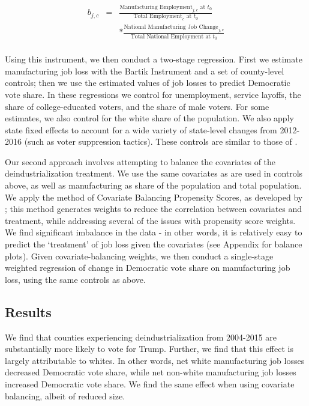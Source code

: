 \documentclass[]{AEA}
\begin{document}
\[
\begin{aligned}
b_{j,c} &=& \frac{\text{Manufacturing Employment}_{j,c} \text{ at } t_0}{\text{Total Employment}_c \text{ at }t_0}  \\
&&  * \frac{\text{National Manufacturing Job Change}_{j,c} }{\text{Total National Employment at }t_0} \\
\end{aligned}
\]

Using this instrument, we then conduct a two-stage regression. First we
estimate manufacturing job loss with the Bartik Instrument and a set of
county-level controls; then we use the estimated values of job losses to
predict Democratic vote share. In these regressions we control for
unemployment, service layoffs, the share of college-educated voters, and
the share of male voters. For some estimates, we also control for the
white share of the population. We also apply state fixed effects to
account for a wide variety of state-level changes from 2012-2016 (such
as voter suppression tactics). These controls are similar to those of
\cite{Baccini21}.

Our second approach involves attempting to balance the covariates of the
deindustrialization treatment. We use the same covariates as are used in
controls above, as well as manufacturing as share of the population and
total population. We apply the method of Covariate Balancing Propensity
Scores, as developed by \cite{Imai14}; this method generates weights to
reduce the correlation between covariates and treatment, while
addressing several of the issues with propensity score weights. We find
significant imbalance in the data - in other words, it is relatively
easy to predict the `treatment' of job loss given the covariates (see
Appendix for balance plots). Given covariate-balancing weights, we then
conduct a single-stage weighted regression of change in Democratic vote
share on manufacturing job loss, using the same controls as above.

\subsection{Results}

We find that counties experiencing deindustrialization from 2004-2015
are substantially more likely to vote for Trump. Further, we find that
this effect is largely attributable to whites. In other words, net white
manufacturing job losses decreased Democratic vote share, while net
non-white manufacturing job losses increased Democratic vote share. We
find the same effect when using covariate balancing, albeit of reduced
size.
\end{document}
